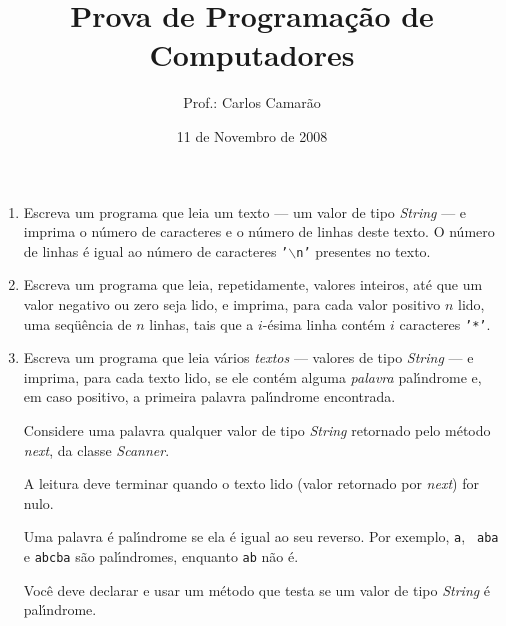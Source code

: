 \documentclass[brazil]{article}
\title{Prova de Programa\c{c}\~ao de Computadores}
\author{Prof.: Carlos Camar\~ao}
\date{11 de Novembro de 2008}
\begin{document}
\maketitle

\begin{enumerate}

\item Escreva um programa que leia um texto --- um valor de tipo {\it
String\/} --- e imprima o n\'umero de caracteres e o n\'umero de
linhas deste texto. O n\'umero de linhas \'e igual ao n\'umero de
caracteres {\tt '$\backslash$n'} presentes no texto.

\item Escreva um programa que leia, repetidamente, valores inteiros,
at\'e que um valor negativo ou zero seja lido, e imprima, para cada
valor positivo $n$ lido, uma seq\"u\^encia de $n$ linhas, tais que a
$i$-\'esima linha cont\'em $i$ caracteres {\tt '*'}.

\item Escreva um programa que leia v\'arios {\em textos\/} --- valores
de tipo {\it String\/} --- e imprima, para cada texto lido, se ele
cont\'em alguma {\em palavra\/} pal\'{\i}ndrome e, em caso positivo, a
primeira palavra pal\'{\i}ndrome encontrada.

Considere uma palavra qualquer valor de tipo {\it String\/} retornado
pelo m\'etodo {\it next\/}, da classe {\it Scanner\/}.

A leitura deve terminar quando o texto lido (valor retornado por {\it
next\/}) for nulo.

Uma palavra \'e pal\'{\i}ndrome se ela \'e igual ao seu reverso. Por
exemplo, {\tt {}a}, {\tt
{}aba} e {\tt {}abcba} s\~ao
pal\'{\i}ndromes, enquanto {\tt {}ab} n\~ao \'e.

Voc\^e deve declarar e usar um m\'etodo que testa se um valor de tipo
{\it String\/} \'e pal\'{\i}ndrome.

\end{enumerate}
\end{document}
